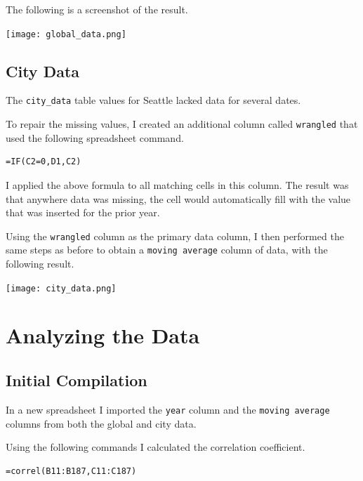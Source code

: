 \documentclass[12pt]{article}
\begin{document}
The following is a screenshot of the result.

\begin{center}
\texttt{[image: global\_data.png]}
\end{center}

\pagebreak

\subsection{City Data}

The \lstinline{city_data} table values for Seattle lacked data for several dates.

To repair the missing values, I created an additional column called \lstinline{wrangled} that used the following spreadsheet command.

\begin{verbatim}
=IF(C2=0,D1,C2)
\end{verbatim}

I applied the above formula to all matching cells in this column. The result was that anywhere data was missing, the cell would automatically fill with the value that was inserted for the prior year.

Using the \lstinline{wrangled} column as the primary data column, I then performed the same steps as before to obtain a \lstinline{moving average} column of data, with the following result.

\begin{center}
\texttt{[image: city\_data.png]}
\end{center}

\pagebreak

\section{Analyzing the Data}

\subsection{Initial Compilation}

In a new spreadsheet I imported the \lstinline{year} column and the \lstinline{moving average} columns from both the global and city data.

Using the following commands I calculated the correlation coefficient.

\begin{verbatim}
=correl(B11:B187,C11:C187)
\end{verbatim}
\end{document}
